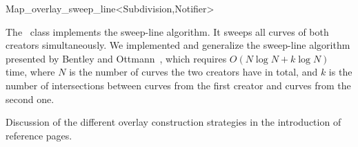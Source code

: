 
\ccRefPageBegin


\renewcommand{\ccRefPageBegin}{\begin{ccAdvanced}}
\renewcommand{\ccRefPageEnd}{\end{ccAdvanced}}

\begin{ccRefClass}{Map_overlay_sweep_line<Subdivision,Notifier>}
\label{OVL_sec:sweep_line}

The \ccRefName\ class implements the sweep-line algorithm.
It sweeps all curves of both creators simultaneously. 
We implemented and generalize the sweep-line algorithm presented by 
Bentley and Ottmann~\cite{bkos-cgaa-97}, which requires 
$O(N\log{N} + k\log{N})$ time, where $N$ is the number of curves the two 
creators have in total, and $k$ is the number of intersections between curves 
from the first creator and curves from the second one.


\ccIsModel

\ccInheritsFrom

\ccSeeAlso
   Discussion of the different overlay construction strategies in the introduction
of  reference pages.

\end{ccRefClass}
\renewcommand{\ccRefPageBegin}{}
\renewcommand{\ccRefPageEnd}{}


\ccRefPageEnd
